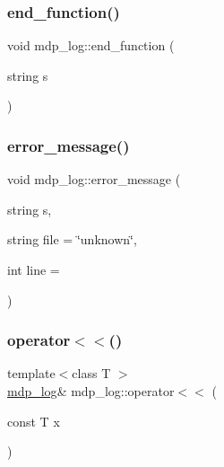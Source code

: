 \mbox{\label{classmdp__log_aeb82bba50423232fe8ad3a37ed65799d}} 
\subsubsection{\texorpdfstring{end\+\_\+function()}{end\_function()}}
{\footnotesize\ttfamily void mdp\+\_\+log\+::end\+\_\+function (\begin{DoxyParamCaption}\item[{string}]{s }\end{DoxyParamCaption})\hspace{0.3cm}{\ttfamily [inline]}}

\mbox{\label{classmdp__log_ad9959b05a20e59a6da2f7b0c31dc5c5a}} 
\subsubsection{\texorpdfstring{error\+\_\+message()}{error\_message()}}
{\footnotesize\ttfamily void mdp\+\_\+log\+::error\+\_\+message (\begin{DoxyParamCaption}\item[{string}]{s,  }\item[{string}]{file = {\ttfamily \char`\"{}unknown\char`\"{}},  }\item[{int}]{line = {} }\end{DoxyParamCaption})\hspace{0.3cm}{\ttfamily [inline]}}

\mbox{\label{classmdp__log_a158f371b0ad011743922bba622d3cd8f}} 
\subsubsection{\texorpdfstring{operator$<$$<$()}{operator<<()}}
{\footnotesize\ttfamily template$<$class T $>$ \\
\hyperlink{classmdp__log}{mdp\+\_\+log}\& mdp\+\_\+log\+::operator$<$$<$ (\begin{DoxyParamCaption}\item[{const T}]{x }\end{DoxyParamCaption})\hspace{0.3cm}{\ttfamily [inline]}}

